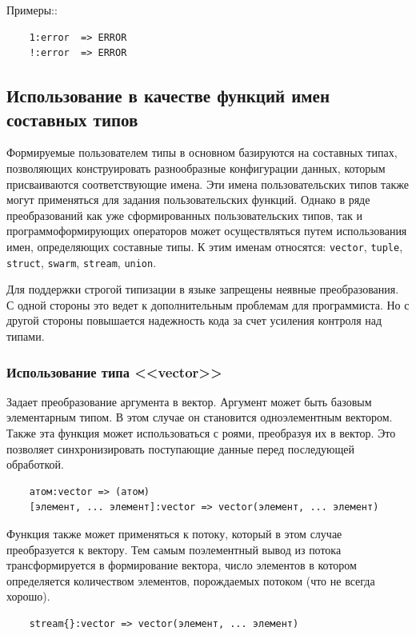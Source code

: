 Примеры::
\begin{verbatim}
    1:error  => ERROR
    !:error  => ERROR
\end{verbatim}

\subsection{Использование в качестве функций имен составных типов}

Формируемые пользователем типы в основном базируются на составных типах, позволяющих конструировать разнообразные конфигурации данных, которым присваиваются соответствующие имена. Эти имена пользовательских типов также могут применяться для задания пользовательских функций. Однако в ряде преобразований как уже сформированных пользовательских типов, так и программоформирующих операторов может осуществляться путем использования имен, определяющих составные типы. К этим именам относятся: \verb|vector|, \verb|tuple|, \verb|struct|, \verb|swarm|, \verb|stream|, \verb|union|.

Для поддержки строгой типизации в языке запрещены неявные преобразования. С одной стороны это ведет к дополнительным проблемам для программиста. Но с другой стороны повышается надежность кода за счет усиления контроля над типами.

\subsubsection{Использование типа <<vector>>}

Задает преобразование аргумента в вектор. Аргумент может быть базовым элементарным типом. В этом случае он становится одноэлементным вектором. Также эта функция может использоваться с роями, преобразуя их в вектор. Это позволяет синхронизировать поступающие данные перед последующей обработкой.
\begin{verbatim}
    атом:vector => (атом)
    [элемент, ... элемент]:vector => vector(элемент, ... элемент)
\end{verbatim}

Функция также может применяться к потоку, который в этом случае преобразуется к вектору. Тем самым поэлементный вывод из потока трансформируется в формирование вектора, число элементов в котором определяется количеством элементов, порождаемых потоком (что не всегда хорошо).
\begin{verbatim}
    stream{}:vector => vector(элемент, ... элемент)
\end{verbatim}

